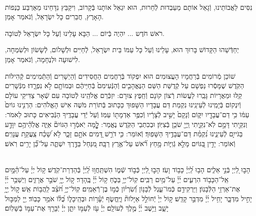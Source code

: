 \documentclass[twoside, openany, parskip=half, 11pt]{book}
\begin{document}
\\
 נִסִּים לַאֲבוֹתֵינוּ, וְֿגָאַל אוֹתָם מֵעַבְדוּת לְֿחֵרוּת, הוּא יִגְאַל אוֹתָנוּ בְּֿקָרוֹב, וִיקַבֵּץ נִדָּחֵינוּ מֵאַרְבַּע כַּנְפוֹת הָאָרֶץ, חֲבֵרִים כָּל יִשְׂרָאֵל, וְֿנֹאמַר אָמֵן.

רֹאשׁ חֹדֶש ... יִהְיֶה בְּֿיוֹם ... הַבָּא עָלֵינוּ וְֿעַל כָּל יִשְׂרָאֵל לְֿטוֹבָה.

יְחַדְּֿשֵׁהוּ הַקָּדוֹשׁ בָּרוּךְ הוּא, עָלֵינוּ וְֿעַל כָּל עַמּוֹ בֵּית יִשְׂרָאֵל, לְֿחַיִּים וּלְשָׁלוֹם, לְֿשָׂשׂוֹן וּלְשִׂמְחָה, לִישׁוּעָה וּלְנֶחָמָה, וְֿנֹאמַר אָמֵן.

\sepline

שׁוֹכֵן מְֿרוֹמִים בְּֿרַחֲמָיו הָעֲצוּמִים הוּא יִפְקוֹד בְּֿרַחֲמִים הַחֲסִידִים וְֿהַיְשָׁרִים וְֿהַתְּֿמִימִים קְֿהִילּוֹת הַקֹּֽדֶשׁ שֶׁמָּסְֿרוּ נַפְשָׁם עַל קְֿדֻשַּׁת הַשֵּׁם הַנֶּאֱהָבִ֤ים וְֿהַנְּֿעִימִם֙ בְּֿחַיֵּיהֶ֔ם וּבְמוֹתָ֖ם לֹ֣א נִפְרָ֑דוּ׃ מִנְּֿשָׁרִים קַֽלּוּ וּמֵאֲרָיוֹת גָּבֵֽרוּ לַעֲשׂוֹת רְֿצוֹן קוֹנָם וְֿחֵֽפֶץ צוּרָם: יִזְכְּֿרֵם אֱלֹהֵֽינוּ לְֿטוֹבָה עִם שְֿׁאָר צַדִּיקֵי עוֹלָם וְֿיִנְקוֹם בְּֿיָמֵֽינוּ לְֿעֵינֵֽינוּ נִקְמַת דַּם עֲבָדָיו הַשָּׁפוּךְ כַּכָּתוּב בְּֿתוֹרַת מֹשֶׁה אִישׁ הָאֱלֹהִים: הַרְנִ֤ינוּ גוֹיִם֙ עַמּ֔וֹ כִּ֥י דַם־עֲבָדָ֖יו יִקּ֑וֹם וְֿנָקָם֙ יָשִׁ֣יב לְֿצָרָ֔יו וְֿכִפֶּ֥ר אַדְמָת֖וֹ עַמּֽוֹ׃ וְֿעַל יְֿדֵי עֲבָדֶֽיךָ הַנְּֿבִיאִים כָּתוּב לֵאמֹר: וְנִקֵּ֖יתִי דָּמָ֣ם לֹֽא־נִקֵּ֑יתִי וַֽיְיָ֖ שֹׁכֵ֥ן בְּֿצִיּֽוֹן׃ וּבְכִתְבֵי הַקֹּֽדֶשׁ נֶאֱמַר: לׇׇׇׇׇׇָ֤מָּה יֹֽאמְֿר֣וּ הַגּוֹיִם֘ אַיֵּ֢ה אֱלֹֽהֵ֫יהֶ֥ם יִוָּדַ֣ע בַּגֹּייִ֣ם לְֿעֵינֵ֑ינוּ נִ֝קְמַ֗ת דַּם־עֲבָדֶ֥יךָ הַשָּׁפֽוּךְ׃ וְֿאוֹמֵר: כִּ֤י דֹרֵ֣שׁ דָּ֭מִים אֹתָ֣ם זָכָ֑ר לֹ֥א שָׁ֝כַ֗ח צַֽעֲקַ֥ת עֲנָוִֽים׃ וְֿאוֹמֵר: יָדִ֣ין בַּ֭גּוֹיִם מָלֵ֣א גְֿוִיּ֑וֹת מָ֥חַץ רֹ֝֗אשׁ עַל־אֶ֥רֶץ רַבָּֽה׃ מִ֭נַּחַל בַּדֶּ֣רֶךְ יִשְׁתֶּ֑ה עַל־כֵּ֝֗ן יָרִ֥ים רֹֽאשׁ׃



\vspace{-0.5\baselineskip}
\ashrei


\yehalelu

\\
%
הָב֣וּ לַ֭יְיָ בְּֿנֵ֣י אֵלִ֑ים הָב֥וּ לַֽ֝יְיָ֗ כָּב֥וֹד וָעֹֽז׃
הָב֣וּ לַ֭יְיָ כְּֿב֣וֹד שְֿׁמ֑וֹ הִשְׁתַּֽחֲו֥וּ לַֽ֝יְיָ֗ בְּֿהַדְרַת־קֹֽדֶשׁ׃
ק֥וֹל יְיָ֗ עַל־הַ֫מָּ֥יִם אֵֽל־הַכָּב֥וֹד הִרְעִ֑ים יְ֜יָ֗ עַל־מַ֥יִם רַבִּֽים׃
קֽוֹל־יְיָ֥ בַּכֹּ֑חַ ק֥וֹל יְ֜יָ֗ בֶּֽהָדָר׃
ק֣וֹל יְ֖יָ֥ שֹׁבֵ֣ר אֲרָזִ֑ים וַיְשַׁבֵּ֥ר יְ֜יָ֗ אֶת־אַרְזֵ֥י הַלְּֿבָנֽוֹן׃
וַיַּרְקִידֵ֥ם כְּֿמוֹ־עֵ֑גֶל לְֿבָנ֥וֹן וְֿ֝שִׂרְי֗וֹן כְּֿמ֣וֹ בֶן־רְֿאֵמִֽים׃
קֽוֹל־יְיָ֥ חֹ֝צֵ֗ב לַֽהֲב֥וֹת אֵֽשׁ׃
ק֣וֹל יְ֖יָ֥ יָחִ֣יל מִדְבָּ֑ר יָחִ֥יל יְ֜יָ֗ מִדְבַּ֣ר קָדֵֽשׁ׃
ק֣וֹל יְיָ֙ יְֿחוֹלֵ֣ל אַיָּלוֹת֘ וַיֶּֽחֱשׂ֢ף יְֿעָ֫ר֥וֹת וּבְהֵֽיכָל֑וֹ כֻּ֝לּ֗וֹ אֹמֵ֥ר כָּבֽוֹד׃
יְ֖יָ לַמַּבּ֣וּל יָשָׁ֑ב וַיֵּ֥שֶׁב יְ֜יָ֗ מֶ֣לֶךְ לְֿעוֹלָֽם׃
יְיָ֗ עֹ֖ז לְֿעַמּ֣וֹ יִתֵּ֑ן יְיָ֓ יְֿבָרֵ֖ךְ אֶת־עַמּ֣וֹ בַֿשָּׁלֽוֹם׃
\end{document}
